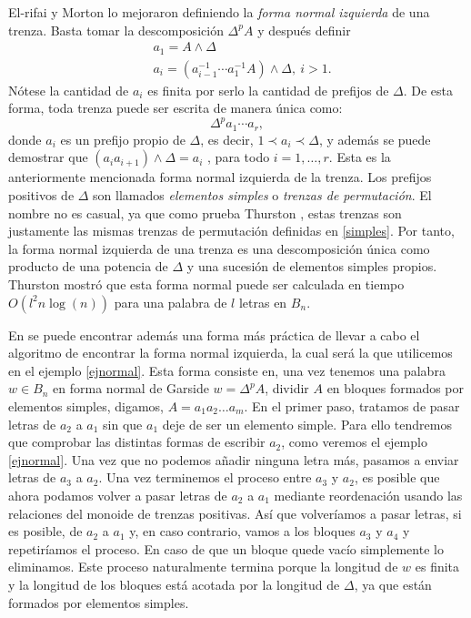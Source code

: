 \documentclass[TFG.tex]{subfiles}
\begin{document}

El-rifai y Morton \cite{EM} lo mejoraron definiendo la \emph{forma normal izquierda} de una trenza. Basta tomar la descomposición $\Delta^pA$ y después definir %
\begin{align*}
&a_1=A\land\Delta\\
&a_i=(a_{i-1}^{-1}\cdots a_1^{-1}A)\land\Delta,\ i>1.
\end{align*}
Nótese la cantidad de $a_i$ es finita por serlo la cantidad de prefijos de $\Delta$. De esta forma, toda trenza puede ser escrita de manera única como:
$$\Delta^p a_1\cdots a_r,$$
donde $a_i$ es un prefijo propio de $\Delta$, es decir, $1\prec a_i\prec\Delta$, y además se puede demostrar que $(a_ia_{i+1})\land\Delta=a_i$ \cite{Thurston}, para todo $i=1,\dots, r$. Esta es la anteriormente mencionada forma normal izquierda de la trenza. Los prefijos positivos de $\Delta$ son llamados \emph{elementos simples} o \emph{trenzas de permutación}. El nombre no es casual, ya que como prueba Thurston \cite{Thurston}, estas trenzas son justamente las mismas trenzas de permutación definidas en \ref{simples}. Por tanto, la forma normal izquierda de una trenza es una descomposición única como producto de una potencia de $\Delta$ y una sucesión de elementos simples propios. Thurston \cite{Thurston} mostró que esta forma normal puede ser calculada en tiempo $O(l^2n\log(n))$ para una palabra de $l$ letras en $B_n$. 


En \cite{Thurston} se puede encontrar además una forma más práctica de llevar a cabo el algoritmo de encontrar la forma normal izquierda, la cual será la que utilicemos en el ejemplo \ref{ejnormal}. Esta forma consiste en, una vez tenemos una palabra $w\in B_n$ en forma normal de Garside $w=\Delta^p A$, dividir $A$ en bloques formados por elementos simples, digamos, $A=a_1a_2\dots a_m$. En el primer paso, tratamos de pasar letras de $a_2$ a $a_1$ sin que $a_1$ deje de ser un elemento simple. Para ello tendremos que comprobar las distintas formas de escribir $a_2$, como veremos el ejemplo \ref{ejnormal}.  Una vez que no podemos añadir ninguna letra más, pasamos a enviar letras de $a_3$ a $a_2$. Una vez terminemos el proceso entre $a_3$ y $a_2$, es posible que ahora podamos volver a pasar letras de $a_2$ a $a_1$ mediante reordenación usando las relaciones del monoide de trenzas positivas. Así que volveríamos a pasar letras, si es posible, de $a_2$ a $a_1$ y, en caso contrario, vamos a los bloques $a_3$ y $a_4$ y repetiríamos el proceso. En caso de que un bloque quede vacío simplemente lo eliminamos. Este proceso naturalmente termina porque la longitud de $w$ es finita y la longitud de los bloques está acotada por la longitud de $\Delta$, ya que están formados por elementos simples. 
\end{document}

